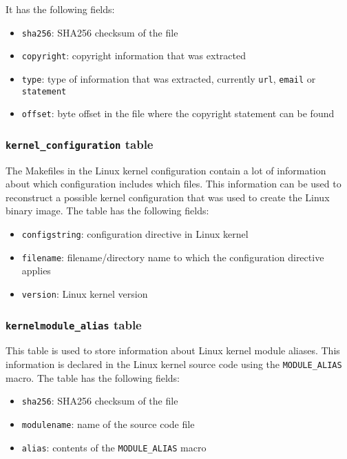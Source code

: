 \documentclass[10pt]{article}
\begin{document}
It has the following fields:

\begin{itemize}
\item \texttt{sha256}: SHA256 checksum of the file
\item \texttt{copyright}: copyright information that was extracted
\item \texttt{type}: type of information that was extracted, currently
\texttt{url}, \texttt{email} or \texttt{statement}
\item \texttt{offset}: byte offset in the file where the copyright statement
can be found
\end{itemize}

\subsubsection{\texttt{kernel\_configuration} table}

The Makefiles in the Linux kernel configuration contain a lot of information
about which configuration includes which files. This information can be used to
reconstruct a possible kernel configuration that was used to create the Linux
binary image. The table has the following fields:

\begin{itemize}
\item \texttt{configstring}: configuration directive in Linux kernel
\item \texttt{filename}: filename/directory name to which the configuration
directive applies
\item \texttt{version}: Linux kernel version
\end{itemize}

\subsubsection{\texttt{kernelmodule\_alias} table}

This table is used to store information about Linux kernel module aliases. This
information is declared in the Linux kernel source code using the
\texttt{MODULE\_ALIAS} macro. The table has the following fields:

\begin{itemize}
\item \texttt{sha256}: SHA256 checksum of the file
\item \texttt{modulename}: name of the source code file
\item \texttt{alias}: contents of the \texttt{MODULE\_ALIAS} macro
\end{itemize}
\end{document}
